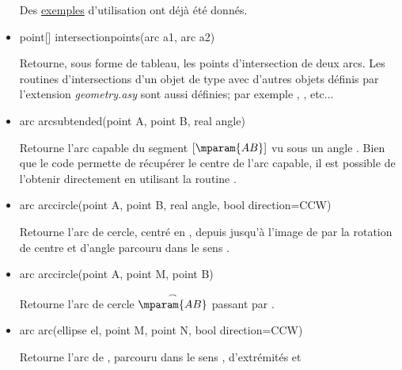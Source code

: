 \documentclass[pdftex]{article}
\newcommand{\geo}{l'extension \emph{geometry.asy}\xspace}
\begin{document}
\begin{itemize}
  Des \href{#markarc}{exemples} d'utilisation ont déjà été donnés.
\item {}
  \begin{Vcolor}
    point[] intersectionpoints(arc a1, arc a2)
  \end{Vcolor}
  Retourne, sous forme de tableau, les points d'intersection de deux
  arcs. Les routines d'intersections d'un objet de type 
  avec d'autres objets définis par \geo sont aussi définies; par
  exemple ,
  ,
   etc...
\item {}
  \begin{Vcolor}
    arc arcsubtended(point A, point B, real angle)
  \end{Vcolor}
  Retourne l'arc capable du segment $[\mparam{AB}]$ vu sous un
  angle . Bien que le code  permette
  de récupérer le centre de l'arc capable, il est possible de
  l'obtenir directement en utilisant la routine
  .
\item {}
  \begin{Vcolor}
    arc arccircle(point A, point B, real angle, bool direction=CCW)
  \end{Vcolor}
  Retourne l'arc de cercle, centré en , depuis 
  jusqu'à l'image de  par la rotation de centre  et
  d'angle  parcouru dans le sens .
\item {}
  \begin{Vcolor}
    arc arccircle(point A, point M, point B)
  \end{Vcolor}
  Retourne l'arc de cercle $\stackrel{\frown}{\mparam{AB}}$ passant
  par .
\item {}
  \begin{Vcolor}
    arc arc(ellipse el, point M, point N, bool direction=CCW)
  \end{Vcolor}
  Retourne l'arc de , parcouru dans le
  sens , d'extrémités  et 

\end{itemize}
\end{document}
